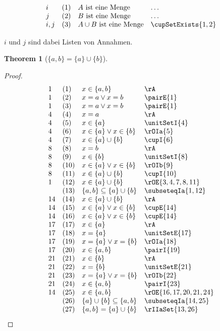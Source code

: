 \documentclass{book}
\theoremstyle{plain}
\newtheorem{theorem}{Theorem}
\theoremstyle{remark}
\theoremstyle{definition}
\begin{document}
\[
\begin{array}{llll}
	i & (1) & A \text{ ist eine Menge} & \dots  \\
        j & (2) & B \text{ ist eine Menge} & \dots  \\
	i,j & (3) & A\cup B\text{ ist eine Menge} & \cupSetExists{1,2} \\
\end{array}
\]

\(i\) und \(j\) sind dabei Listen von Annahmen.


\label{LbawbRbEqualsLbaRbcuLbbRb}
\begin{theorem}[\(\{a,b\}=\{a\}\cup \{b\}\)]
\end{theorem}	
\begin{proof}
	\[
	\begin{array}{llll}
		1 & (1) & x\in \{a,b\} & \rA \\
		1 & (2) & x=a\lor x=b & \pairE{1} \\
		1 & (3) & x=a\lor x=b & \pairE{1} \\
		4 & (4) & x=a & \rA \\
		4 & (5) & x\in \{a\} & \unitSetI{4} \\
		4 & (6) & x\in \{a\}\lor x\in \{b\} & \rOIa{5} \\
		4 & (7) & x\in \{a\}\cup \{b\} & \cupI{6} \\
		8 & (8) & x=b & \rA \\
		8 & (9) & x\in \{b\} & \unitSetI{8} \\
		8 & (10) & x\in \{a\}\lor x\in \{b\} & \rOIb{9} \\
		8 & (11) & x\in \{a\}\cup \{b\} & \cupI{10} \\
		1 & (12) & x\in \{a\}\cup \{b\} & \rOE{3,4,7,8,11} \\
		& (13) & \{a,b\}\subseteq \{a\}\cup \{b\} & \subseteqIa{1,12} \\
		14& (14) & x\in \{a\}\cup \{b\} & \rA \\
		14& (15) & x\in \{a\}\lor x\in \{b\} & \cupE{14} \\
		14& (16) & x\in \{a\}\lor x\in \{b\} & \cupE{14} \\
		17& (17) & x\in \{a\} & \rA \\
		17& (18) & x = \{a\} & \unitSetE{17} \\
		17& (19) & x = \{a\}\lor x = \{b\} & \rOIa{18} \\
		17& (20) & x \in \{a,b\} & \pairI{19} \\
		21& (21) & x\in \{b\} & \rA \\
		21& (22) & x = \{b\} & \unitSetE{21} \\
		21& (23) & x = \{a\}\lor x = \{b\} & \rOIb{22} \\
		21& (24) & x \in \{a,b\} & \pairI{23} \\
		14& (25) & x \in \{a,b\} & \rOE{16,17,20,21,24} \\
		& (26) & \{a\}\cup \{b\}\subseteq \{a,b\} & \subseteqIa{14,25} \\
		& (27) & \{a,b\} = \{a\}\cup \{b\} & \rIIaSet{13,26} \\
	\end{array}
	\]
\end{proof}
\end{document}
